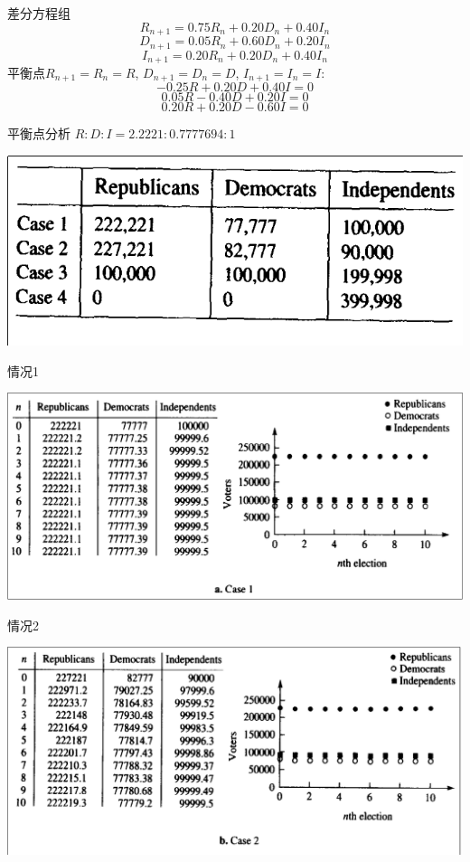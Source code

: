 \documentclass{beamer}
\begin{document}
\begin{frame}{差分方程组}
\[
R_{n+1}=0.75R_n+0.20D_n+0.40I_n
\]
\[
D_{n+1}=0.05R_n+0.60D_n+0.20I_n
\]
\[
I_{n+1}=0.20R_n+0.20D_n+0.40I_n
\]
平衡点$R_{n+1}=R_n=R$, $D_{n+1}=D_n=D$, $I_{n+1}=I_n=I$:
\[
-0.25R+0.20D+0.40I=0
\]
\[
0.05R-0.40D+0.20I=0
\]
\[
0.20R+0.20D-0.60I=0
\]
\end{frame}

\begin{frame}{平衡点分析}
$R:D:I = 2.2221:0.7777694:1$

\begin{center}
  \includegraphics[width=.6\textwidth{}]{party-case.png}
\end{center}  
  
\end{frame}

\begin{frame}{情况1}
  \begin{center}
    \includegraphics[width=.9\textwidth{}]{party-1.png}
  \end{center}  
\end{frame}

\begin{frame}{情况2}
  \begin{center}
    \includegraphics[width=.9\textwidth{}]{party-2.png}
  \end{center}  
\end{frame}
\end{document}
